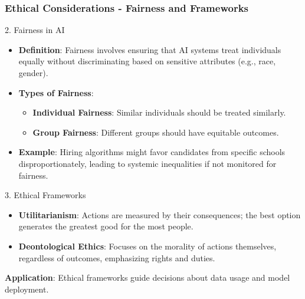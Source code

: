 \documentclass[aspectratio=169]{beamer}
\begin{document}
\begin{frame}[fragile]
    \frametitle{Ethical Considerations - Fairness and Frameworks}
    \begin{block}{2. Fairness in AI}
        \begin{itemize}
            \item \textbf{Definition}: Fairness involves ensuring that AI systems treat individuals equally without discriminating based on sensitive attributes (e.g., race, gender).
            \item \textbf{Types of Fairness}:
            \begin{itemize}
                \item \textbf{Individual Fairness}: Similar individuals should be treated similarly.
                \item \textbf{Group Fairness}: Different groups should have equitable outcomes.
            \end{itemize}
            \item \textbf{Example}: Hiring algorithms might favor candidates from specific schools disproportionately, leading to systemic inequalities if not monitored for fairness.
        \end{itemize}
    \end{block}

    \begin{block}{3. Ethical Frameworks}
        \begin{itemize}
            \item \textbf{Utilitarianism}: Actions are measured by their consequences; the best option generates the greatest good for the most people.
            \item \textbf{Deontological Ethics}: Focuses on the morality of actions themselves, regardless of outcomes, emphasizing rights and duties.
        \end{itemize}
        \textbf{Application}: Ethical frameworks guide decisions about data usage and model deployment.
    \end{block}
\end{frame}
\end{document}
